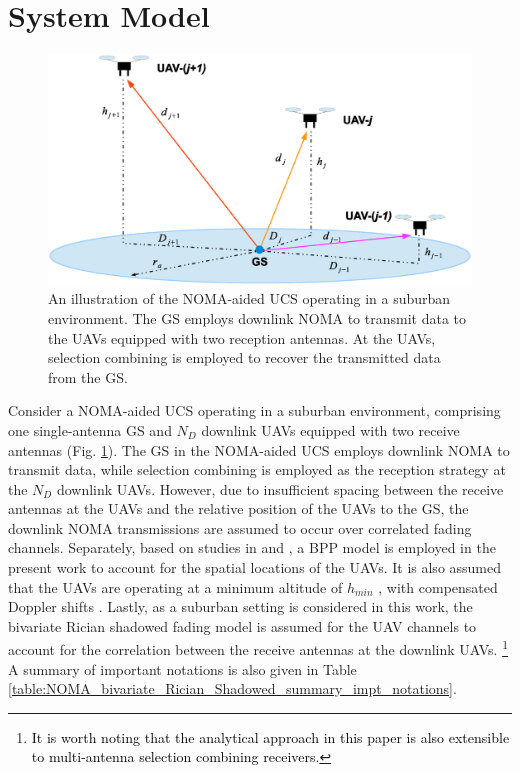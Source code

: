 \section{System Model} \label{NOMA_bivariate_Rician_Shadowed_sec_sys_model}

\begin{figure} [th]
\centering
\vspace{-0.8cm}
\includegraphics [width=0.6\columnwidth]{chap8_fig/block_diagram3.eps}
\caption{An illustration of the NOMA-aided UCS operating in a suburban environment. The GS employs downlink NOMA to transmit data to the UAVs equipped with two reception antennas. At the UAVs, selection combining is employed to recover the transmitted data from the GS.}
\label{fig:NOMA_bivariate_Rician_Shadowed_system_model}
\end{figure}

Consider a NOMA-aided UCS operating in a suburban environment, comprising one single-antenna GS and $N_D$ downlink UAVs equipped with two receive antennas (Fig. \ref{fig:NOMA_bivariate_Rician_Shadowed_system_model}). The GS in the NOMA-aided UCS employs downlink NOMA to transmit data, while selection combining is employed as the reception strategy at the $N_D$ downlink UAVs. However, due to insufficient spacing between the receive antennas at the UAVs and the relative position of the UAVs to the GS, the downlink NOMA transmissions are assumed to occur over correlated fading channels. Separately, based on studies in \cite{chetlur2017downlink} and \cite{wang2018modeling}, a BPP model is employed in the present work to account for the spatial locations of the UAVs. It is also assumed that the UAVs are operating at a minimum altitude of $h_{min}$ \cite{chetlur2017downlink,wang2018modeling}, with compensated Doppler shifts \cite{tan2018joint}. Lastly, as a suburban setting is considered in this work, the bivariate Rician shadowed fading model is assumed for the UAV channels to account for the correlation between the receive antennas at the downlink UAVs. \textcolor{black}{\footnote{\textcolor{black}{It is worth noting that the analytical approach in this paper is also extensible to multi-antenna selection combining receivers.}}} A summary of important notations is also given in Table \ref{table:NOMA_bivariate_Rician_Shadowed_summary_impt_notations}.

